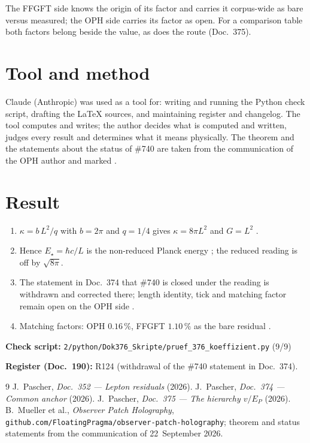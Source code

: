 The FFGFT side knows the origin of its factor and carries it corpus-wide as
bare versus measured; the OPH side carries its factor as open. For a
comparison table both factors belong beside the value, as does the route
(Doc.~375).

\section*{Tool and method}
Claude (Anthropic) was used as a tool for: writing and running the Python
check script, drafting the \LaTeX{} sources, and maintaining register and
changelog. The tool computes and writes; the author decides what is computed
and written, judges every result and determines what it means physically. The
theorem and the statements about the status of \#740 are taken from the
communication of the OPH author and marked \QM.

\section{Result}

\begin{enumerate}
\item $\kappa=b\,L^2/q$ with $b=2\pi$ and $q=1/4$ gives $\kappa=8\pi L^2$ and
  $G=L^2$ \KM{} \QM.
\item Hence $E_\star=\hbar c/L$ is the non-reduced Planck energy \BM; the
  reduced reading is off by $\sqrt{8\pi}$.
\item The statement in Doc.~374 that \#740 is closed under the reading is
  withdrawn and corrected there; length identity, tick and matching factor remain open on the OPH
  side \QM.
\item Matching factors: OPH $0.16\,\%$, FFGFT $1.10\,\%$ as the bare residual
  \KM.
\end{enumerate}

\medskip
\noindent\textbf{Check script:} \texttt{2/python/Dok376\_Skripte/pruef\_376\_koeffizient.py} (9/9)

\medskip
\noindent\textbf{Register (Doc.~190):} R124 (withdrawal of the \#740 statement in Doc.~374).

\begin{thebibliography}{9}
 J.~Pascher, \emph{Doc.~352 --- Lepton residuals} (2026).
 J.~Pascher, \emph{Doc.~374 --- Common anchor} (2026).
 J.~Pascher, \emph{Doc.~375 --- The hierarchy $v/E_P$} (2026).
 B.~Mueller et al., \emph{Observer Patch Holography},
  \texttt{github.com/FloatingPragma/observer-patch-holography}; theorem and
  status statements from the communication of 22~September 2026.
\end{thebibliography}

